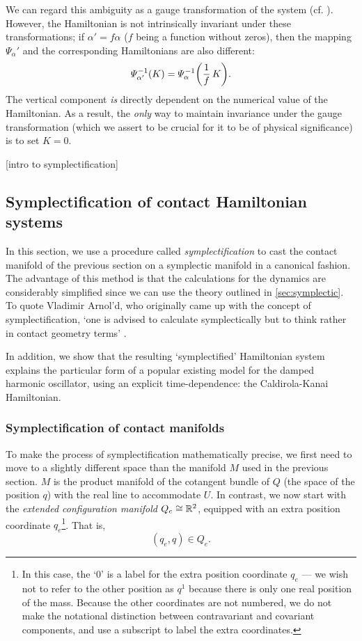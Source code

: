 We can regard this ambiguity as a gauge transformation of the system (cf. \citet{Balian2001}). However, the Hamiltonian is not intrinsically invariant under these transformations; if \( \alpha' = f \alpha \) (\(f\) being a function without zeros), then the mapping \(\Psi_\alpha'\) and the corresponding Hamiltonians are also different: \cite[p. 321]{Libermann1987} 
\begin{equation}
    \Psi^{-1}_{\alpha'}(K) = \Psi^{-1}_{\alpha}\qty(\frac{1}{f}\,K).
    \label{eq:contact_ham_scaling}
\end{equation}
The vertical component \emph{is} directly dependent on the numerical value of the Hamiltonian. As a result, the \emph{only} way to maintain invariance under the gauge transformation (which we assert to be crucial for it to be of physical significance) is to set \(K = 0\).

[intro to symplectification]

\subsection{Symplectification of contact Hamiltonian systems}
\label{ssec:symplectification}
In this section, we use a procedure called \emph{symplectification} to cast the contact manifold of the previous section on a symplectic manifold in a canonical fashion. The advantage of this method is that the calculations for the dynamics are considerably simplified since we can use the theory outlined in \cref{sec:symplectic}. To quote Vladimir Arnol'd, who originally came up with the concept of symplectification, `one is advised to calculate symplectically but to think rather in contact geometry terms’ \cite{VanderSchaft2021a,Arnold1989a}.

In addition, we show that the resulting `symplectified' Hamiltonian system explains the particular form of a popular existing model for the damped harmonic oscillator, using an explicit time-dependence: the Caldirola-Kanai Hamiltonian.

\subsubsection{Symplectification of contact manifolds}
To make the process of symplectification mathematically precise, we first need to move to a slightly different space than the manifold \(M\) used in the previous section. \(M\) is the product manifold of the cotangent bundle of \(Q\) (the space of the position \(q\)) with the real line to accommodate \(U\). In contrast, we now start with the \emph{extended configuration manifold} \(Q_e \cong \mathbb{R}^2\), equipped with an extra position coordinate \(q_e\)\footnote{In this case, the `0' is a label for the extra position coordinate $q_e$ --- we wish not to refer to the other position as $q^1$ because there is only one real position of the mass. Because the other coordinates are not numbered, we do not make the notational distinction between contravariant and covariant components, and use a subscript to label the extra coordinates.}. That is,
\begin{equation}
     (q_e, q) \in Q_e.
\end{equation}

